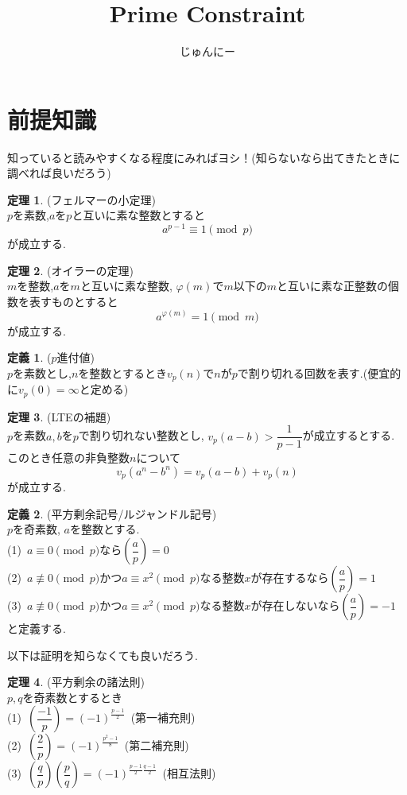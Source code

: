 \documentclass{ltjsarticle}
\title{Prime Constraint}
\author{じゅんにー}
\theoremstyle{definition}
\newtheorem{thm}{定理}
\newtheorem{dfn}{定義}
\begin{document}
\maketitle
\tableofcontents
\newpage
\section{前提知識}
知っていると読みやすくなる程度にみればヨシ！(知らないなら出てきたときに調べれば良いだろう)

\begin{thm}(フェルマーの小定理)\\
$p$を素数,$a$を$p$と互いに素な整数とすると$$a^{p-1}\equiv1\pmod p$$が成立する.
\end{thm}

\begin{thm}(オイラーの定理)\\
$m$を整数,$a$を$m$と互いに素な整数, $\varphi(m)$で$m$以下の$m$と互いに素な正整数の個数を表すものとすると$$a^{\varphi(m)}=1\pmod m$$が成立する.
\end{thm}

\begin{dfn}($p$進付値)\\
$p$を素数とし,$n$を整数とするとき$v_p(n)$で$n$が$p$で割り切れる回数を表す.(便宜的に$v_p(0)=\infty$と定める)
\end{dfn}

\begin{thm}(LTEの補題)\\
$p$を素数$a,b$を$p$で割り切れない整数とし, $v_p(a-b)>\dfrac1{p-1}$が成立するとする. このとき任意の非負整数$n$について$$v_p(a^n-b^n)=v_p(a-b)+v_p(n)$$が成立する.
\end{thm}

\begin{dfn}(平方剰余記号/ルジャンドル記号)\\
$p$を奇素数, $a$を整数とする.\\
(1)\ $a\equiv0\pmod p$なら$\left(\dfrac ap\right)=0$\\
(2)\ $a\not\equiv0\pmod p$かつ$a\equiv x^2\pmod p$なる整数$x$が存在するなら$\left(\dfrac ap\right)=1$\\
(3)\ $a\not\equiv0\pmod p$かつ$a\equiv x^2\pmod p$なる整数$x$が存在しないなら$\left(\dfrac ap\right)=-1$\\
と定義する.
\end{dfn}

以下は証明を知らなくても良いだろう.

\begin{thm}(平方剰余の諸法則)\\
$p,q$を奇素数とするとき\\
(1)\ $\left(\dfrac{-1}p\right)=(-1)^{\frac{p-1}2}$\ (第一補充則)\\
(2)\ $\left(\dfrac{2}p\right)=(-1)^{\frac{p^2-1}8}$\ (第二補充則)\\
(3)\ $\left(\dfrac qp\right)\left(\dfrac pq\right)=(-1)^{\frac{p-1}2\frac{q-1}2}$\ (相互法則)
\end{thm}
\end{document}
